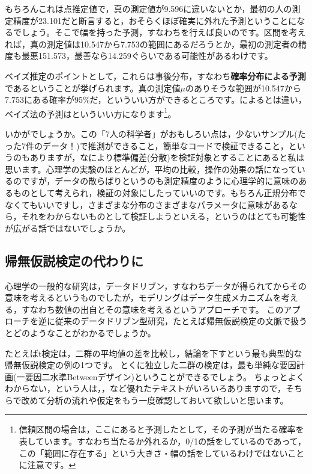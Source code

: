 \documentclass{ltjsbook}
\begin{document}
もちろんこれは点推定値で，真の測定値が9.596に違いないとか，最初の人の測定精度が23.101だと断言すると，おそらくほぼ確実に外れた予測ということになるでしょう。そこで幅を持った予測，すなわちを行えば良いのです。区間を考えれば，真の測定値は10.547から7.753の範囲にあるだろうとか，最初の測定者の精度も最悪151.573，最善なら14.259ぐらいである可能性があるわけです。

ベイズ推定のポイントとして，これらは事後分布，すなわち\textbf{確率分布による予測}であるということが挙げられます。真の測定値$\mu$のありそうな範囲が10.547から7.753にある確率が95\%だ，といういい方ができるところです。によるとは違い，ベイズ法の予測はといういい方になります\footnote{信頼区間の場合は，ここにあると予測したとして，その予測が当たる確率を表しています。すなわち当たるか外れるか，0/1の話をしているのであって，この「範囲に存在する」という大きさ・幅の話をしているわけではないことに注意です。}。

いかがでしょうか。この「7人の科学者」がおもしろい点は，少ないサンプル(たった7件のデータ！)で推測ができること，簡単なコードで検証できること，というのもありますが，なにより標準偏差(分散)を検証対象とすることにあると私は思います。心理学の実験のほとんどが，平均の比較，操作の効果の話になっているのですが，データの散らばりというのも測定精度のように心理学的に意味のあるものとして考えられ，検証の対象にしたっていいのです。もちろん正規分布でなくてもいいですし，さまざまな分布のさまざまなパラメータに意味があるなら，それをわからないものとして検証しようといえる，というのはとても可能性が広がる話ではないでしょうか。

\subsection{帰無仮説検定の代わりに}
心理学の一般的な研究は，データドリブン，すなわちデータが得られてからその意味を考えるというものでしたが，モデリングはデータ生成メカニズムを考える，すなわち数値の出自とその意味を考えるというアプローチです。
このアプローチを逆に従来のデータドリブン型研究，たとえば帰無仮説検定の文脈で扱うとどのようなことがわかるでしょうか。

たとえばt検定は，二群の平均値の差を比較し，結論を下すという最も典型的な帰無仮説検定の例の1つです。
とくに独立した二群の検定は，最も単純な要因計画(一要因二水準Betweenデザイン)ということができるでしょう。
ちょっとよくわからない，という人は，\citet{Yamada2004}，\citet{Shimizu2021}など優れたテキストがいろいろありますので，そちらで改めて分析の流れや仮定をもう一度確認しておいて欲しいと思います。
\end{document}
